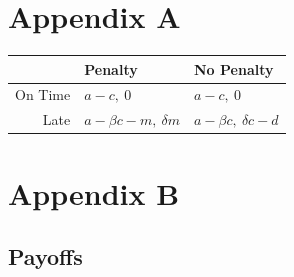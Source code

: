 \documentclass[11pt,preprint, authoryear]{elsarticle}
\let\origtable\table
\let\endorigtable\endtable
\renewenvironment{table}[1][2] {
    \expandafter\origtable\expandafter[H]
} {
    \endorigtable
}
\numberwithin{equation}{section}
\numberwithin{figure}{section}
\numberwithin{table}{section}
\begin{document}
\newpage

\hypertarget{appendix-a}{%
\section*{\texorpdfstring{Appendix A
\label{A}}{Appendix A }}\label{appendix-a}}

\begin{table}[H]
\centering
\begin{tabular}{rll}
  \toprule
 & Penalty & No Penalty \\ 
  \midrule
On Time & $a-c, \ 0$ & $a-c, \ 0$ \\ 
  Late & $a-\beta c - m, \ \delta m$ & $a-\beta c, \ \delta c -d$ \\ 
   \bottomrule
\end{tabular}
\caption{Strategic form of the game \label{tab1}} 
\end{table}

\hypertarget{appendix-b}{%
\section*{\texorpdfstring{Appendix B
\label{B}}{Appendix B }}\label{appendix-b}}

\hypertarget{payoffs}{%
\subsection*{\texorpdfstring{Payoffs
\label{payoff}}{Payoffs }}\label{payoffs}}
\end{document}
